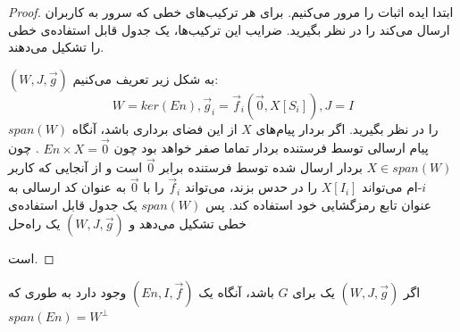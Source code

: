 \begin{proof}
    ابتدا ایده اثبات را مرور می‌کنیم. برای هر 
    \lpicod
    ترکیب‌های خطی که سرور به کاربران ارسال می‌کند را در نظر بگیرید. ضرایب این ترکیب‌ها، یک جدول قابل استفاده‌ی خطی را تشکیل می‌دهند.

    \lpsicod 
    $(W, J, \overrightarrow{g})$
     به شکل زیر تعریف می‌کنیم:
     $$W = ker(En), \overrightarrow{g}_i = \overrightarrow{f}_i(\overrightarrow{0}, X[S_i]), J = I$$
    $span(W)$
     را در نظر بگیرید. اگر بردار پیام‌های
     $X$
      از این فضای برداری باشد، آنگاه پیام ارسالی توسط فرستنده بردار تماما صفر خواهد بود چون 
      $En \times X = \overrightarrow{0}$
      . چون
      $X \in span(W)$
       بردار ارسال شده توسط فرستنده برابر
      $\overrightarrow{0}$
       است و از آنجایی که کاربر 
       $i$-ام
        می‌تواند 
       $X[I_i]$
        را در 
        \picod
         حدس بزند، می‌تواند
         $\overrightarrow{f}_i$ 
        را با 
        $\overrightarrow{0}$ 
        به عنوان کد ارسالی به عنوان تابع رمزگشایی خود استفاده کند. پس 
        $span(W)$
         یک جدول قابل استفاده‌ی خطی تشکیل می‌دهد و 
        $(W, J, \overrightarrow{g})$ 
        یک راه‌حل
          
        است.
\end{proof}

\begin{lemma}
    اگر
     $(W, J, \overrightarrow{g})$
      یک 
      \lpsicod
       برای $G$ باشد، آنگاه یک
       \lpicod
        $(En, I, \overrightarrow{f})$
        وجود دارد به طوری که
         $span(En) = W^{\bot}$
\end{lemma}

